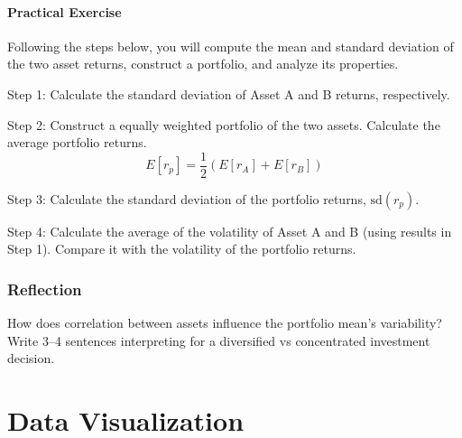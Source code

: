 \documentclass[
  12pt,
  letterpaper,
]{scrbook}
\theoremstyle{plain}
\theoremstyle{definition}
\theoremstyle{remark}
\begin{document}
\subsubsection{\texorpdfstring{{Practical
Exercise}}{Practical Exercise}}\label{practical-exercise}

Following the steps below, you will compute the mean and standard
deviation of the two asset returns, construct a portfolio, and analyze
its properties.

Step 1: Calculate the standard deviation of Asset A and B returns,
respectively.

Step 2: Construct a equally weighted portfolio of the two assets.
Calculate the average portfolio returns. \[
E[r_p] = \frac{1}{2} (E[r_A] + E[r_B])
\]

Step 3: Calculate the standard deviation of the portfolio returns,
\(\text{sd}(r_p)\).

Step 4: Calculate the average of the volatility of Asset A and B (using
results in Step 1). Compare it with the volatility of the portfolio
returns.

\subsection{Reflection}\label{reflection}

How does correlation between assets influence the portfolio mean's
variability? Write 3--4 sentences interpreting for a diversified vs
concentrated investment decision.

\chapter{Data Visualization}\label{data-visualization}
\end{document}
